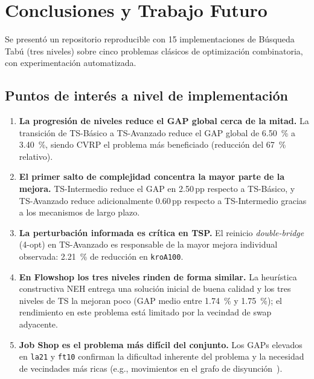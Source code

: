 \section{Conclusiones y Trabajo Futuro}
\label{sec:conclusiones}

Se presentó un repositorio reproducible con 15 implementaciones de
Búsqueda Tabú (tres niveles) sobre cinco problemas clásicos de optimización
combinatoria, con experimentación automatizada.

\subsection*{Puntos de interés a nivel de implementación}

\begin{enumerate}
  \item \textbf{La progresión de niveles reduce el GAP global cerca de la
    mitad.}
    La transición de TS-Básico a TS-Avanzado reduce el GAP global de
    \SI{6.50}{\percent} a \SI{3.40}{\percent}, siendo CVRP el problema
    más beneficiado (reducción del \SI{67}{\percent} relativo).

  \item \textbf{El primer salto de complejidad concentra la mayor parte de
    la mejora.}
    TS-Intermedio reduce el GAP en 2.50\,pp respecto a
    TS-Básico, y TS-Avanzado reduce adicionalmente 0.60\,pp respecto a TS-Intermedio gracias a los mecanismos de largo plazo.

  \item \textbf{La perturbación informada es crítica en TSP.}
    El reinicio \emph{double-bridge} (4-opt) en TS-Avanzado es responsable
    de la mayor mejora individual observada: \SI{2.21}{\percent} de
    reducción en \texttt{kroA100}.

  \item \textbf{En Flowshop los tres niveles rinden de forma similar.}
    La heurística constructiva NEH entrega una solución inicial de buena
    calidad y los tres niveles de TS la mejoran poco (GAP medio entre
    \SI{1.74}{\percent} y \SI{1.75}{\percent}); el rendimiento en este
    problema está limitado por la vecindad de swap adyacente.

  \item \textbf{Job Shop es el problema más difícil del conjunto.}
    Los GAPs elevados en \texttt{la21} y \texttt{ft10} confirman la
    dificultad inherente del problema y la necesidad de vecindades más
    ricas (e.g., movimientos en el grafo de disyunción~\cite{balas1998one}).
\end{enumerate}

